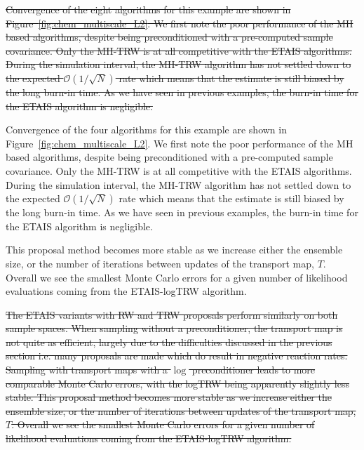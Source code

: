 \documentclass[final]{siamltex}
\newcommand{\edit}[1]{{\color{red} #1}}  %
\providecommand{\DIFdel}[1]{{\protect\color{red}\sout{#1}}}                      %
\providecommand{\DIFaddbegin}{} %
\providecommand{\DIFaddend}{} %
\providecommand{\DIFdelbegin}{} %
\providecommand{\DIFdelend}{} %
\newcommand{\DIFscaledelfig}{0.5}
\newlength{\DIFdelgraphicswidth} %
\newlength{\DIFdelgraphicsheight} %
\newcommand{\DIFaddincludegraphics}[2][]{{\color{blue}\fbox{\DIFOincludegraphics[#1]{#2}}}} %
\newcommand{\DIFdelincludegraphics}[2][]{%
\sbox{\DIFdelgraphicsbox}{\DIFOincludegraphics[#1]{#2}}%
\settoboxwidth{\DIFdelgraphicswidth}{\DIFdelgraphicsbox} %
\settoboxtotalheight{\DIFdelgraphicsheight}{\DIFdelgraphicsbox} %
\scalebox{\DIFscaledelfig}{%
\parbox[b]{\DIFdelgraphicswidth}{\usebox{\DIFdelgraphicsbox}\\[-\baselineskip] \rule{\DIFdelgraphicswidth}{0em}}\llap{\resizebox{\DIFdelgraphicswidth}{\DIFdelgraphicsheight}{%
\setlength{\unitlength}{\DIFdelgraphicswidth}%
\begin{picture}(1,1)%
\thicklines\linethickness{2pt} %
{\color[rgb]{1,0,0}\put(0,0){\framebox(1,1){}}}%
{\color[rgb]{1,0,0}\put(0,0){\line( 1,1){1}}}%
{\color[rgb]{1,0,0}\put(0,1){\line(1,-1){1}}}%
\end{picture}%
}\hspace*{3pt}}} %
} %
\DeclareRobustCommand{\DIFaddbegin}{\DIFOaddbegin \let\includegraphics\DIFaddincludegraphics} %
\DeclareRobustCommand{\DIFaddend}{\DIFOaddend \let\includegraphics\DIFOincludegraphics} %
\DeclareRobustCommand{\DIFdelbegin}{\DIFOdelbegin \let\includegraphics\DIFdelincludegraphics} %
\DeclareRobustCommand{\DIFdelend}{\DIFOaddend \let\includegraphics\DIFOincludegraphics} %
\begin{document}
\DIFdelbegin \DIFdel{Convergence of the eight algorithms for this example are shown in
Figure~\ref{fig:chem_multiscale_L2}. We first note the poor
performance of the MH based algorithms, despite being preconditioned
with a pre-computed sample covariance. Only the MH-TRW is at all competitive with the ETAIS algorithms. During the simulation interval, the MH-TRW algorithm has not settled down to the expected $\mathcal{O}(1/\sqrt{N})$ rate which means that the estimate is still biased by the long burn-in time. As we have seen in previous examples, the burn-in time for the ETAIS algorithm is negligible.
}\DIFdelend \DIFaddbegin \edit{
Convergence of the four algorithms for this example are shown in
Figure~\ref{fig:chem_multiscale_L2}. We first note the poor
performance of the MH based algorithms, despite being preconditioned
with a pre-computed sample covariance. Only the MH-TRW is at all competitive with the ETAIS algorithms. During the simulation interval, the MH-TRW algorithm has not settled down to the expected $\mathcal{O}(1/\sqrt{N})$ rate which means that the estimate is still biased by the long burn-in time. As we have seen in previous examples, the burn-in time for the ETAIS algorithm is negligible.

This proposal method
becomes more stable as we increase either the ensemble size, or the
number of iterations between updates of the transport map,
$T$. Overall we see the smallest Monte Carlo errors for a given number
of likelihood evaluations coming from the ETAIS-logTRW algorithm.
}
\DIFaddend 

\DIFdelbegin \DIFdel{The ETAIS variants with RW and TRW proposals perform similarly on both
sample spaces. When sampling without a preconditioner, the transport map is not
quite as efficient, largely due to the difficulties discussed in the
previous section i.e. many proposals are made which do result in
negative reaction rates. Sampling with transport maps with a $\log$
preconditioner leads to more comparable Monte Carlo errors, with the
logTRW being apparently slightly less stable. This proposal method
becomes more stable as we increase either the ensemble size, or the
number of iterations between updates of the transport map,
$T$. Overall we see the smallest Monte Carlo errors for a given number
of likelihood evaluations coming from the ETAIS-logTRW algorithm.
}%
\end{document}
